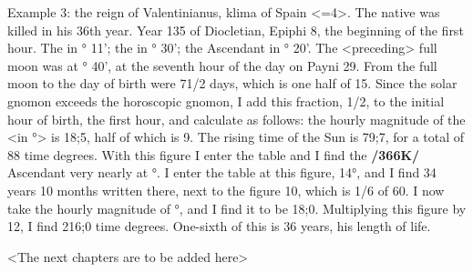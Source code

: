 Example 3: the reign of Valentinianus, klima of Spain <=4>. The native was killed in his 36th year. Year 135 of Diocletian, Epiphi 8, the beginning of the first hour. The \Sun\xspace in \Cancer\xspace 7° 11'; the \Moon\xspace in \Aries\xspace 22° 30'; the Ascendant in \Cancer\xspace 7° 20'. The <preceding> full moon was at \Gemini\xspace 18° 40', at the seventh hour of the day on Payni 29. From the full moon to the day of birth were 71/2 days, which is one half of 15. Since the solar gnomon exceeds the horoscopic gnomon, I add this fraction, 1/2, to the initial hour of birth, the first hour, and calculate as follows: the hourly magnitude of the \Sun\xspace <in \Cancer\xspace 7°> is 18;5, half of which is 9. The rising time of the Sun is 79;7, for a total of 88 time degrees. With this figure I enter the table and I find the \textbf{/366K/} Ascendant very nearly at \Cancer\xspace 14°. I enter the table at this figure, 14°, and I find 34 years 10 months written there, next to the figure 10, which is 1/6 of 60. I now take the hourly magnitude of \Cancer\xspace 14°, and I find it to be 18;0. Multiplying this figure by 12, I find 216;0 time degrees. One-sixth of this is 36 years, his length of life.

\partialsecbr

<The next chapters are to be added here>

\newpage
